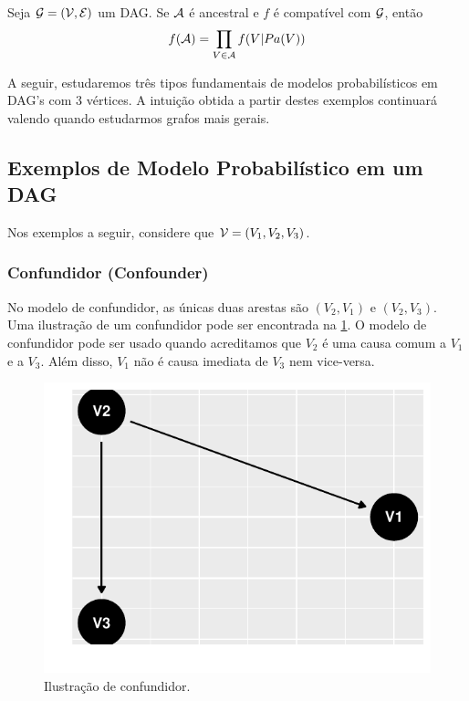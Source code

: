 \begin{lemma}
 \label{lem:anc_fat}
 Seja ${\mathcal G} = ({\mathcal V}, {\mathcal E})$ um DAG.
 Se ${\mathcal A}$ é ancestral e 
 $f$ é compatível com ${\mathcal G}$, então
 \begin{align*}
  f({\mathcal A}) = \prod_{V \in {\mathcal A}} f(V|Pa(V))
 \end{align*}
\end{lemma}

A seguir, estudaremos três tipos fundamentais
de modelos probabilísticos em DAG's com
$3$ vértices. 
A intuição obtida a partir destes
exemplos continuará valendo quando
estudarmos grafos mais gerais.

\subsection{Exemplos de Modelo Probabilístico em um DAG}
\label{sec:dag-ex}

Nos exemplos a seguir, considere que
${\mathcal V} = (V_1, V_2, V_3)$.

\subsubsection{Confundidor (Confounder)}

No modelo de confundidor, 
as únicas duas arestas são 
$(V_2, V_1)$ e $(V_2, V_3)$.
Uma ilustração de um confundidor
pode ser encontrada 
na \cref{fig:confundidor}.
O modelo de confundidor pode ser usado quando
acreditamos que $V_2$ é uma causa comum a
$V_1$ e a $V_3$. Além disso,
$V_1$ não é causa imediata de $V_3$ 
nem vice-versa.

\begin{knitrout}
\color{fgcolor}\begin{figure}[t]

{\centering \includegraphics[width=\maxwidth]{./figures/confundidor-1} 

}

\caption[Ilustração de confundidor]{Ilustração de confundidor.}\label{fig:confundidor}
\end{figure}

\end{knitrout}

